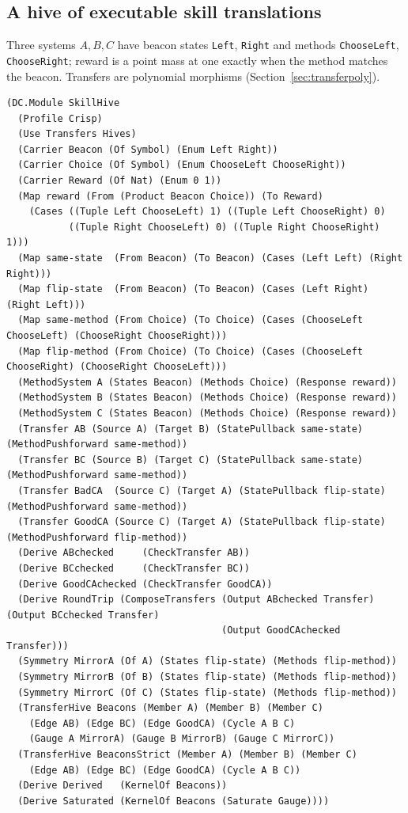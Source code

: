 \documentclass[11pt]{article}
\newcommand{\code}[1]{\texttt{#1}}
\theoremstyle{definition}
\theoremstyle{plain}
\begin{document}
\subsection{A hive of executable skill translations}\label{sec:skills}

Three systems $A,B,C$ have beacon states \code{Left}, \code{Right} and methods \code{ChooseLeft},
\code{ChooseRight}; reward is a point mass at one exactly when the method matches the beacon.
Transfers are polynomial morphisms (Section~\ref{sec:transferpoly}).

\begin{lstlisting}[basicstyle=\ttfamily\footnotesize,title={\scriptsize\ttfamily fixtures/skill\_hive.metta}]
(DC.Module SkillHive
  (Profile Crisp)
  (Use Transfers Hives)
  (Carrier Beacon (Of Symbol) (Enum Left Right))
  (Carrier Choice (Of Symbol) (Enum ChooseLeft ChooseRight))
  (Carrier Reward (Of Nat) (Enum 0 1))
  (Map reward (From (Product Beacon Choice)) (To Reward)
    (Cases ((Tuple Left ChooseLeft) 1) ((Tuple Left ChooseRight) 0)
           ((Tuple Right ChooseLeft) 0) ((Tuple Right ChooseRight) 1)))
  (Map same-state  (From Beacon) (To Beacon) (Cases (Left Left) (Right Right)))
  (Map flip-state  (From Beacon) (To Beacon) (Cases (Left Right) (Right Left)))
  (Map same-method (From Choice) (To Choice) (Cases (ChooseLeft ChooseLeft) (ChooseRight ChooseRight)))
  (Map flip-method (From Choice) (To Choice) (Cases (ChooseLeft ChooseRight) (ChooseRight ChooseLeft)))
  (MethodSystem A (States Beacon) (Methods Choice) (Response reward))
  (MethodSystem B (States Beacon) (Methods Choice) (Response reward))
  (MethodSystem C (States Beacon) (Methods Choice) (Response reward))
  (Transfer AB (Source A) (Target B) (StatePullback same-state) (MethodPushforward same-method))
  (Transfer BC (Source B) (Target C) (StatePullback same-state) (MethodPushforward same-method))
  (Transfer BadCA  (Source C) (Target A) (StatePullback flip-state) (MethodPushforward same-method))
  (Transfer GoodCA (Source C) (Target A) (StatePullback flip-state) (MethodPushforward flip-method))
  (Derive ABchecked     (CheckTransfer AB))
  (Derive BCchecked     (CheckTransfer BC))
  (Derive GoodCAchecked (CheckTransfer GoodCA))
  (Derive RoundTrip (ComposeTransfers (Output ABchecked Transfer) (Output BCchecked Transfer)
                                      (Output GoodCAchecked Transfer)))
  (Symmetry MirrorA (Of A) (States flip-state) (Methods flip-method))
  (Symmetry MirrorB (Of B) (States flip-state) (Methods flip-method))
  (Symmetry MirrorC (Of C) (States flip-state) (Methods flip-method))
  (TransferHive Beacons (Member A) (Member B) (Member C)
    (Edge AB) (Edge BC) (Edge GoodCA) (Cycle A B C)
    (Gauge A MirrorA) (Gauge B MirrorB) (Gauge C MirrorC))
  (TransferHive BeaconsStrict (Member A) (Member B) (Member C)
    (Edge AB) (Edge BC) (Edge GoodCA) (Cycle A B C))
  (Derive Derived   (KernelOf Beacons))
  (Derive Saturated (KernelOf Beacons (Saturate Gauge))))
\end{lstlisting}
\end{document}
